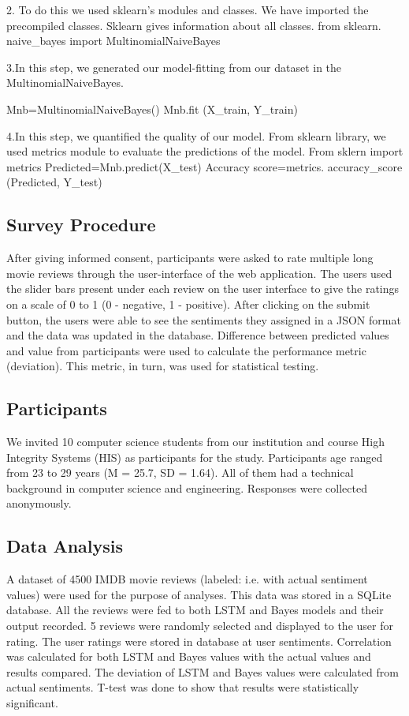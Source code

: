 \documentclass[sigplan,screen]{acmart}
\begin{document}
2. To do this we used sklearn’s modules and classes. We have imported the precompiled classes. Sklearn gives information about all classes.
from sklearn. naive\_bayes import MultinomialNaiveBayes

3.In this step, we generated our model-fitting from our dataset in the MultinomialNaiveBayes.

Mnb=MultinomialNaiveBayes() 
Mnb.fit (X\_train, Y\_train)

4.In this step, we quantified the quality of our model. From sklearn library, we used metrics module to evaluate the predictions of the model.
From sklern import metrics
Predicted=Mnb.predict(X\_test)
Accuracy score=metrics. accuracy\_score (Predicted, Y\_test)


\subsection{Survey Procedure}
After giving informed consent, participants were asked to rate multiple long movie reviews through the user-interface of the web application. The users used the slider bars present under each review on the user interface to give the ratings on a scale of 0 to 1 (0 - negative, 1 - positive). After clicking on the submit button, the users were able to see the sentiments they assigned in a JSON format and the data was updated in the database. Difference between predicted values and value from participants were used to calculate the performance metric (deviation). This metric, in turn, was used for statistical testing.

\subsection{Participants}
We invited 10 computer science students from our institution and course High Integrity Systems (HIS) as participants for the study. Participants age ranged from 23 to 29 years (M = 25.7, SD = 1.64). All of them had a technical background in computer science and engineering. Responses were collected anonymously.


\subsection{Data Analysis}
A dataset of 4500 IMDB movie reviews (labeled: i.e. with actual sentiment values) were used for the purpose of analyses. This data was stored in a SQLite database. All the reviews were fed to both LSTM and Bayes models and their output recorded. 5 reviews were randomly selected and displayed to the user for rating. The user ratings were stored in database at user sentiments. Correlation was calculated for both LSTM and Bayes values with the actual values and results compared. The deviation of LSTM and Bayes values were calculated from actual sentiments. T-test was done to show that results were statistically significant.
\end{document}
